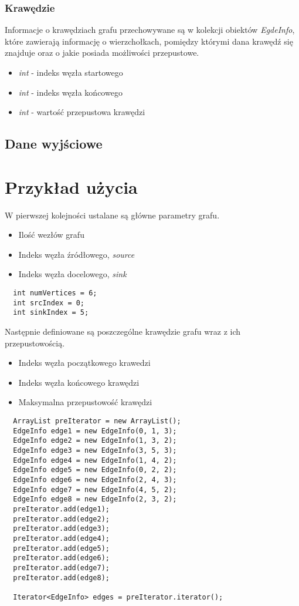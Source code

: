 \documentclass[10pt]{minutes}
\begin{document}
  \subsubsection{Krawędzie}
    Informacje o krawędziach grafu przechowywane są w kolekcji obiektów \emph{EgdeInfo}, które zawierają informację o wierzchołkach,
pomiędzy którymi dana krawędź się znajduje oraz o jakie posiada możliwości przepustowe.
    \begin{itemize}
      \item \emph{int} - indeks węzła startowego
      \item \emph{int} - indeks węzła końcowego
      \item \emph{int} - wartość przepustowa krawędzi
    \end{itemize}

  \subsection{Dane wyjściowe}

\section{Przykład użycia}
W pierwszej kolejności ustalane są główne parametry grafu.
\begin{itemize}
\item Ilość wezłów grafu
\item Indeks węzła źródłowego, \emph{source}
\item Indeks węzła docelowego, \emph{sink}
\end{itemize}
\begin{lstlisting}        
  int numVertices = 6; 
  int srcIndex = 0; 
  int sinkIndex = 5;
\end{lstlisting}

Następnie definiowane są poszczególne krawędzie grafu wraz z ich przepustowością.
\begin{itemize}
\item Indeks węzła początkowego krawedzi
\item Indeks węzła końcowego krawędzi
\item Maksymalna przepustowość krawędzi
\end{itemize}
\begin{lstlisting}
  ArrayList preIterator = new ArrayList();
  EdgeInfo edge1 = new EdgeInfo(0, 1, 3);
  EdgeInfo edge2 = new EdgeInfo(1, 3, 2);
  EdgeInfo edge3 = new EdgeInfo(3, 5, 3);
  EdgeInfo edge4 = new EdgeInfo(1, 4, 2);
  EdgeInfo edge5 = new EdgeInfo(0, 2, 2);
  EdgeInfo edge6 = new EdgeInfo(2, 4, 3);
  EdgeInfo edge7 = new EdgeInfo(4, 5, 2);
  EdgeInfo edge8 = new EdgeInfo(2, 3, 2);
  preIterator.add(edge1);
  preIterator.add(edge2);
  preIterator.add(edge3);
  preIterator.add(edge4);
  preIterator.add(edge5);
  preIterator.add(edge6);
  preIterator.add(edge7);
  preIterator.add(edge8);
                               
  Iterator<EdgeInfo> edges = preIterator.iterator();  
\end{lstlisting}
 
\end{document}
